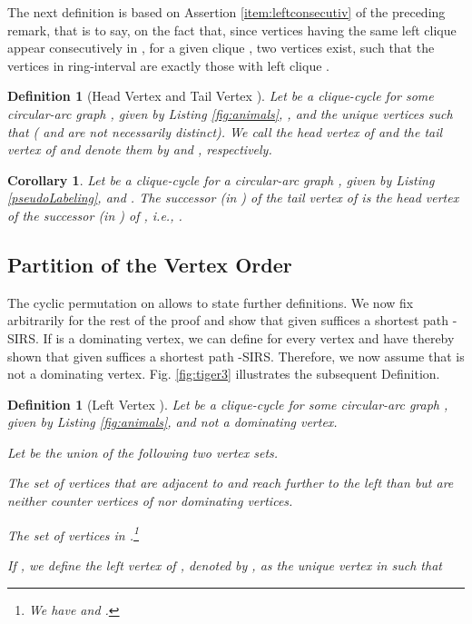 \documentclass[10pt]{article}
\newtheorem{corollary}[theorem]{Corollary}
\newtheorem{definition}[theorem]{Definition}
\begin{document}
The next definition is based on Assertion \ref{item:leftconsecutiv} of the preceding 
remark, that is to say, on the fact that, since vertices having the same left clique 
appear consecutively in , for a given clique , two 
vertices  exist, such that the vertices in  ring-interval  are 
exactly those with left clique .

\begin{definition}[Head Vertex  and Tail Vertex ]
Let  be a clique-cycle for some circular-arc graph ,  
given by Listing \ref{fig:animals}, , and  the unique 
vertices such that  ( and  are not necessarily distinct).
We call  the \emph{head vertex of } and  the \emph{tail vertex of } 
and denote them by  and , respectively.
\end{definition}



\begin{corollary}\label{coro:tail vertexheal}
Let  be a clique-cycle for a circular-arc graph ,  given 
by Listing \ref{pseudoLabeling}, and .
The successor (in ) of the tail vertex of  is the head vertex of the 
successor (in ) of , i.e.,
.
\end{corollary}







\subsection{Partition of the Vertex Order}\label{furtherDefs}





The cyclic permutation  on  allows to state further definitions.
We now fix  arbitrarily for the rest of the proof and show that  given  
suffices a shortest path -SIRS.
If  is a dominating vertex, we can define  
for every vertex  and have thereby shown that  given  suffices a shortest path -SIRS.
Therefore, we now assume that  is not a dominating vertex.
Fig. \ref{fig:tiger3} illustrates the subsequent Definition.

\begin{definition}[Left Vertex ]\label{de_l_v}
Let  be a clique-cycle for some circular-arc graph ,  
given by Listing \ref{fig:animals}, and  not a dominating vertex.
\begin{inparaenum}[(i)]
Let  be the union of the following two vertex sets.
\item The set of
vertices that are adjacent to  and reach further to the left than  
but are neither counter vertices of  nor dominating vertices.
\item
The set of vertices in .\footnote{We have  and .}
\end{inparaenum}
If , we define the \emph{left vertex of }, denoted by ,  
as the unique vertex in  such that

\end{definition}
\end{document}
